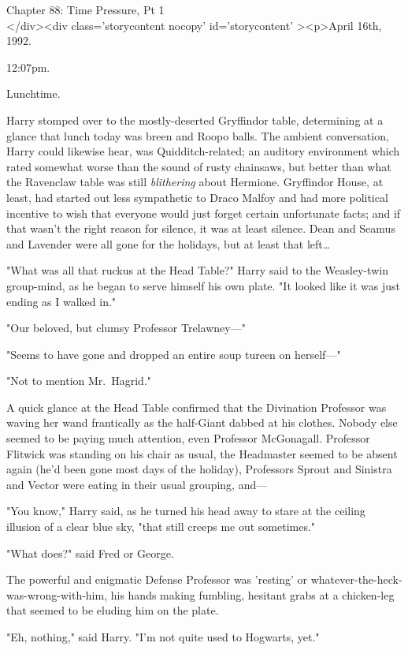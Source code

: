 
Chapter 88: Time Pressure, Pt 1\\
</div><div  class='storycontent nocopy' id='storycontent' ><p>April 16th, 1992.

12:07pm.

Lunchtime.

Harry stomped over to the mostly-deserted Gryffindor table, determining at a glance that lunch today was breen and Roopo balls. The ambient conversation, Harry could likewise hear, was Quidditch-related; an auditory environment which rated somewhat worse than the sound of rusty chainsaws, but better than what the Ravenclaw table was still \emph{blithering} about Hermione. Gryffindor House, at least, had started out less sympathetic to Draco Malfoy and had more political incentive to wish that everyone would just forget certain unfortunate facts; and if that wasn't the right reason for silence, it was at least silence. Dean and Seamus and Lavender were all gone for the holidays, but at least that left{\ldots}

"What was all that ruckus at the Head Table?" Harry said to the Weasley-twin group-mind, as he began to serve himself his own plate. "It looked like it was just ending as I walked in."

"Our beloved, but clumsy Professor Trelawney---"

"Seems to have gone and dropped an entire soup tureen on herself---"

"Not to mention Mr.~Hagrid."

A quick glance at the Head Table confirmed that the Divination Professor was waving her wand frantically as the half-Giant dabbed at his clothes. Nobody else seemed to be paying much attention, even Professor McGonagall. Professor Flitwick was standing on his chair as usual, the Headmaster seemed to be absent again (he'd been gone most days of the holiday), Professors Sprout and Sinistra and Vector were eating in their usual grouping, and---

"You know," Harry said, as he turned his head away to stare at the ceiling illusion of a clear blue sky, "that still creeps me out sometimes."

"What does?" said Fred or George.

The powerful and enigmatic Defense Professor was 'resting' or whatever-the-heck-was-wrong-with-him, his hands making fumbling, hesitant grabs at a chicken-leg that seemed to be eluding him on the plate.

"Eh, nothing," said Harry. "I'm not quite used to Hogwarts, yet."

